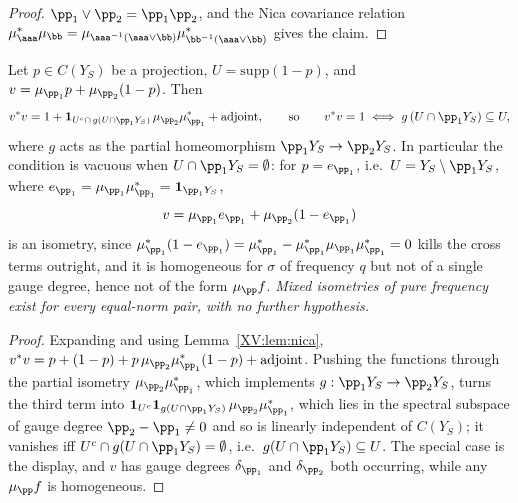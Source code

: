 \begin{proof}
$\pp_1\vee\pp_2=\pp_1\pp_2$, and the Nica covariance relation \cite{Nica}
$\mu_\aaa^*\mu_\bb=\mu_{\aaa^{-1}(\aaa\vee\bb)}\mu_{\bb^{-1}(\aaa\vee\bb)}^*$ gives the claim.
\end{proof}

\begin{proposition}\label{XV:prop:mixed}
Let $p\in C(Y_S)$ be a projection, $U=\mathrm{supp}(1-p)$, and
$v=\mu_{\pp_1}p+\mu_{\pp_2}(1-p)$. Then
\[
v^*v=1+\mathbf 1_{U^c\cap\,g(U\cap\pp_1Y_S)}\,\mu_{\pp_2}\mu_{\pp_1}^*+\text{adjoint},
\qquad\text{so}\qquad
v^*v=1\iff g\,(U\cap\pp_1Y_S)\subseteq U,
\]
where $g$ acts as the partial homeomorphism $\pp_1Y_S\to\pp_2Y_S$. In particular the
condition is vacuous when $U\cap\pp_1Y_S=\emptyset$: for $p=e_{\pp_1}$, i.e.\
$U=Y_S\setminus\pp_1Y_S$, where $e_{\pp_1}=\mu_{\pp_1}\mu_{\pp_1}^*=\mathbf 1_{\pp_1Y_S}$,
\[
v=\mu_{\pp_1}e_{\pp_1}+\mu_{\pp_2}(1-e_{\pp_1})
\]
is an isometry, since $\mu_{\pp_1}^*(1-e_{\pp_1})=\mu_{\pp_1}^*-\mu_{\pp_1}^*\mu_{\pp_1}\mu_{\pp_1}^*=0$
kills the cross terms outright, and it is homogeneous for $\sigma$ of frequency $q$ but not
of a single gauge degree, hence not of the form $\mu_\pp f$. \emph{Mixed isometries of pure
frequency exist for every equal-norm pair, with no further hypothesis.}
\end{proposition}

\begin{proof}
Expanding and using Lemma~\ref{XV:lem:nica},
$v^*v=p+(1-p)+p\,\mu_{\pp_2}\mu_{\pp_1}^*(1-p)+\text{adjoint}$. Pushing the functions
through the partial isometry $\mu_{\pp_2}\mu_{\pp_1}^*$, which implements
$g:\pp_1Y_S\to\pp_2Y_S$, turns the third term into
$\mathbf 1_{U^c}\mathbf 1_{g(U\cap\pp_1Y_S)}\,\mu_{\pp_2}\mu_{\pp_1}^*$, which lies in the
spectral subspace of gauge degree $\pp_2-\pp_1\ne0$ and so is linearly independent of
$C(Y_S)$; it vanishes iff $U^c\cap g(U\cap\pp_1Y_S)=\emptyset$, i.e.\
$g(U\cap\pp_1Y_S)\subseteq U$. The special case is the display, and $v$ has gauge degrees
$\delta_{\pp_1}$ and $\delta_{\pp_2}$ both occurring, while any $\mu_\pp f$ is homogeneous.
\end{proof}

